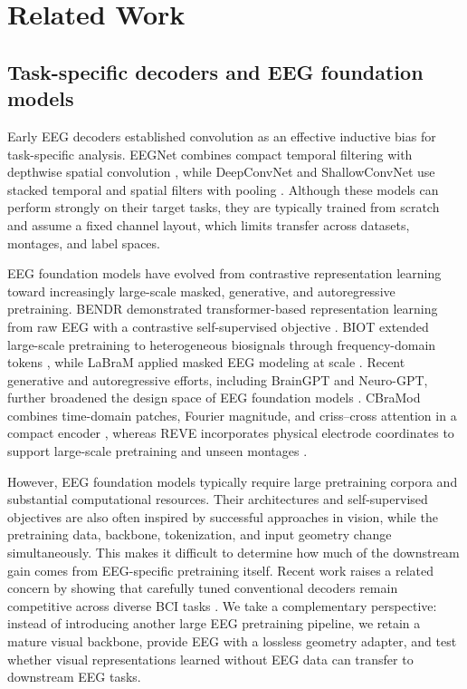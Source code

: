 \section{Related Work}

\subsection{Task-specific decoders and EEG foundation models}

Early EEG decoders established convolution as an effective inductive bias for
task-specific analysis. EEGNet combines compact temporal filtering with
depthwise spatial convolution \citep{lawhern2018eegnet}, while DeepConvNet and
ShallowConvNet use stacked temporal and spatial filters with pooling
\citep{schirrmeister2017deep}. Although these models can perform strongly on
their target tasks, they are typically trained from scratch and assume a fixed
channel layout, which limits transfer across datasets, montages, and label
spaces.

EEG foundation models have evolved from contrastive representation learning
toward increasingly large-scale masked, generative, and autoregressive
pretraining. BENDR demonstrated transformer-based representation learning from
raw EEG with a contrastive self-supervised objective
\citep{kostas2021bendr}. BIOT extended large-scale pretraining to heterogeneous
biosignals through frequency-domain tokens \citep{yang2023biot}, while LaBraM
applied masked EEG modeling at scale \citep{jiang2024labram}. Recent
generative and autoregressive efforts, including BrainGPT and Neuro-GPT,
further broadened the design space of EEG foundation models
\citep{yue2024braingpt,cui2024neurogpt}. CBraMod combines time-domain patches,
Fourier magnitude, and criss--cross attention in a compact encoder
\citep{wang2025cbramod}, whereas REVE incorporates physical electrode
coordinates to support large-scale pretraining and unseen montages
\citep{elouahidi2025reve}.

However, EEG foundation models typically require large pretraining corpora and
substantial computational resources. Their architectures and self-supervised
objectives are also often inspired by successful approaches in vision, while
the pretraining data, backbone, tokenization, and input geometry change
simultaneously. This makes it difficult to determine how much of the
downstream gain comes from EEG-specific pretraining itself. Recent work raises
a related concern by showing that carefully tuned conventional decoders remain
competitive across diverse BCI tasks \citep{yang2026are}. We take a
complementary perspective: instead of introducing another large EEG
pretraining pipeline, we retain a mature visual backbone, provide EEG with a
lossless geometry adapter, and test whether visual representations learned
without EEG data can transfer to downstream EEG tasks.


